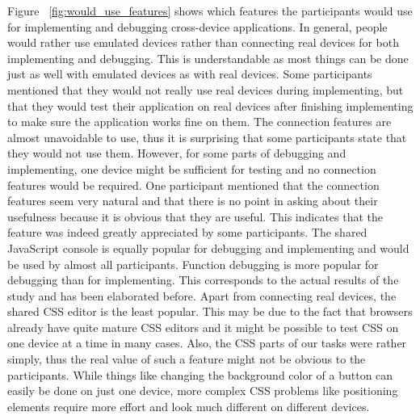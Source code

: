 Figure ~\ref{fig:would_use_features} shows which features the participants would use for implementing and debugging cross-device applications. In general, people would rather use emulated devices rather than connecting real devices for both implementing and debugging. This is understandable as most things can be done just as well with emulated devices as with real devices. Some participants mentioned that they would not really use real devices during implementing, but that they would test their application on real devices after finishing implementing to make sure the application works fine on them. The connection features are almost unavoidable to use, thus it is surprising that some participants state that they would not use them. However, for some parts of debugging and implementing, one device might be sufficient for testing and no connection features would be required. One participant mentioned that the connection features seem very natural and that there is no point in asking about their usefulness because it is obvious that they are useful. This indicates that the feature was indeed greatly appreciated by some participants. The shared JavaScript console is equally popular for debugging and implementing and would be used by almost all participants. Function debugging is more popular for debugging than for implementing. This corresponds to the actual results of the study and has been elaborated before. Apart from connecting real devices, the shared CSS editor is the least popular. This may be due to the fact that browsers already have quite mature CSS editors and it might be possible to test CSS on one device at a time in many cases. Also, the CSS parts of our tasks were rather simply, thus the real value of such a feature might not be obvious to the participants. While things like changing the background color of a button can easily be done on just one device, more complex CSS problems like positioning elements require more effort and look much different on different devices.

